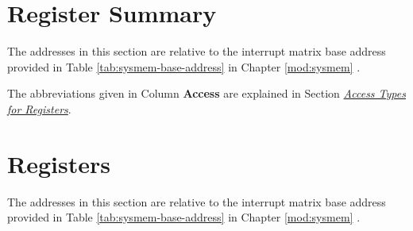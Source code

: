 \documentclass[main\_\_EN.tex]{subfiles}
\begin{document}
\begin{landscape}

\hypertarget{intmtrx-reg-summ}{}
\section{Register Summary}\label{sec:intmtrx-reg-summ}
The addresses in this section are relative to the interrupt matrix base address provided in Table \ref{tab:sysmem-base-address} in Chapter \ref{mod:sysmem} \textit{}.

The abbreviations given in Column \textbf{Access} are explained in Section \hyperref[glossary-access-types]{\textit{Access Types for Registers}}.


\end{landscape}

\section{Registers}

The addresses in this section are relative to the interrupt matrix base address provided in Table \ref{tab:sysmem-base-address} in Chapter \ref{mod:sysmem} \textit{}.

\end{document}
